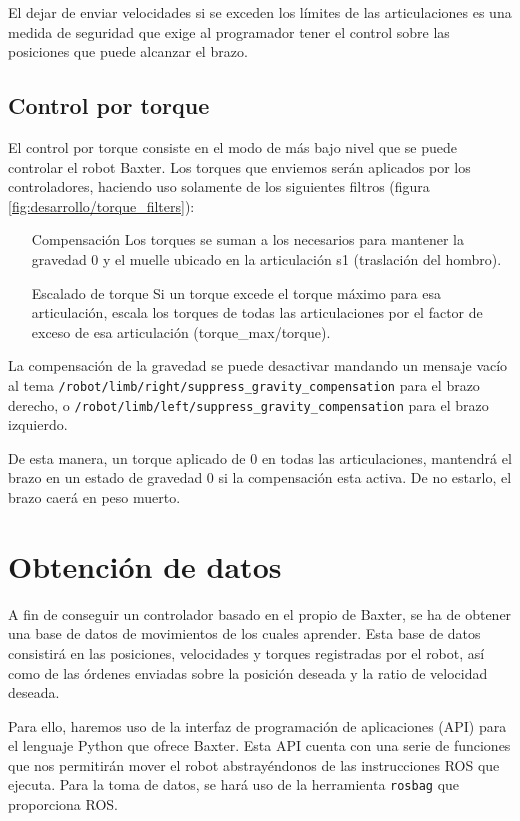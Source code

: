 El dejar de enviar velocidades si se exceden los límites de las articulaciones es una medida de seguridad que exige al programador tener el control sobre las posiciones que puede alcanzar el brazo.

\subsection{Control por torque}
El control por torque consiste en el modo de más bajo nivel que se puede controlar el robot Baxter. Los torques que enviemos serán aplicados por los controladores, haciendo uso solamente de los siguientes filtros (figura \ref{fig:desarrollo/torque_filters}):

\begin{enumerate}
\item [Compensación] Los torques se suman a los necesarios para mantener la gravedad 0 y el muelle ubicado en la articulación s1 (traslación del hombro).
\item [Escalado de torque] Si un torque excede el torque máximo para esa articulación, escala los torques de todas las articulaciones por el factor de exceso de esa articulación (torque\_max/torque).
\end{enumerate}

La compensación de la gravedad se puede desactivar mandando un mensaje vacío al tema \verb|/robot/limb/right/suppress_gravity_compensation| para el brazo derecho, o \verb|/robot/limb/left/suppress_gravity_compensation| para el brazo izquierdo.

De esta manera, un torque aplicado de 0 en todas las articulaciones, mantendrá el brazo en un estado de gravedad 0 si la compensación esta activa. De no estarlo, el brazo caerá en peso muerto.
	

\section{Obtención de datos}
A fin de conseguir un controlador basado en el propio de Baxter, se ha de obtener una base de datos de movimientos de los cuales aprender. Esta base de datos consistirá en las posiciones, velocidades y torques registradas por el robot, así como de las órdenes enviadas sobre la posición deseada y la ratio de velocidad deseada.

Para ello, haremos uso de la interfaz de programación de aplicaciones (API) para el lenguaje Python que ofrece Baxter. Esta API cuenta con una serie de funciones que nos permitirán mover el robot abstrayéndonos de las instrucciones ROS que ejecuta. Para la toma de datos, se hará uso de la herramienta \verb|rosbag| que proporciona ROS.

